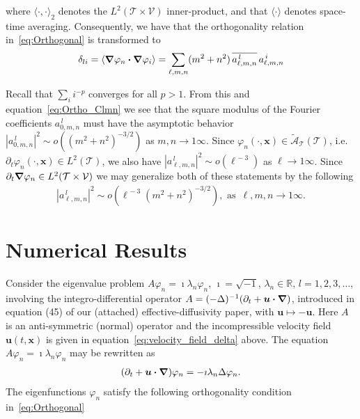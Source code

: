\documentclass[leqno,onefignum,onetabnum]{siamltex1213}
\newcommand{\Tc}{\mathcal{T}}
\newcommand{\Vc}{\mathcal{V}}
\newcommand{\As}{\mathscr{A}}
\newcommand\bnabla{\mbox{\boldmath${\nabla}$}}
\providecommand\bcdot{\boldsymbol{\cdot}}
\newcommand{\vecx}{\boldsymbol{x}}
\newcommand{\vecu}{\boldsymbol{u}}
\begin{document}
where $\langle\cdot,\cdot\rangle_2$ denotes the $L^2(\Tc\times\Vc)$ inner-product, and that
$\langle\cdot\rangle$ denotes space-time averaging. Consequently, we have that the
orthogonality relation in~\eqref{eq:Orthogonal} is transformed to   
%
\begin{align}\label{eq:Ortho_Clmn}
  \delta_{li}=\langle\bnabla \varphi_n\bcdot\bnabla \varphi_i\rangle
      = \sum_{\ell,m,n}(m^2+n^2)\,\overline{a^{\,l}_{\ell,m,n}}\,a^{\,i}_{\ell,m,n}
\end{align}
%


Recall that $\sum_ii^{-p}$ converges for all $p>1$. From this and
equation~\eqref{eq:Ortho_Clmn} we see that the square modulus of the  
Fourier coefficients $a^{\,l}_{0,m,n}$ must have the asymptotic behavior 
$|a^{\,l}_{0,m,n}|^2\sim o((m^2+n^2)^{-3/2})$ as $m,n\to1\infty$. Since
$\varphi_n(\cdot,\vecx)\in\tilde{\As}_{\Tc}(\Tc)$, i.e. $\partial_t\varphi_n(\cdot,\vecx)\in L^2(\Tc)$, we also
have $|a^{\,l}_{\ell,m,n}|^2\sim o(\ell^{\,-3})$ as $\ell\to1\infty$. Since
$\partial_t\bnabla \varphi_n\in L^2(\Tc\times\Vc)$ we may generalize 
both of these statements by the following
%
\begin{align}\label{eq:Clmn_assymptotics}
  |a^{\,l}_{\ell,m,n}|^2\sim o(\ell^{\,-3}(m^2+n^2)^{-3/2}), \text{ as } \,\ell,m,n\to1\infty.
\end{align}
%







\section{Numerical Results}
%
Consider the eigenvalue problem $A\varphi_n=\imath\lambda_n\varphi_n$, $\imath=\sqrt{-1}$,
$\lambda_n\in\mathbb{R}$, $l=1,2,3,\ldots$, involving the integro-differential operator
$A=(-\Delta)^{-1}(\partial_t+\vecu \bcdot\bnabla )$,  
introduced in equation (45) of our (attached) effective-diffusivity
paper, with $\vecu \mapsto-\vecu $. Here $A$ is an anti-symmetric (normal)
operator and the incompressible velocity field
$\vecu (t,\vecx)$
is given in equation~\eqref{eq:velocity_field_delta} above. The equation $A\varphi_n=\imath\lambda_n\varphi_n$ may be
rewritten as     
%
\begin{align}\label{eq:Eig_prob}
  (\partial_t+\vecu \bcdot\bnabla )\varphi_n=-\imath\lambda_n\Delta\varphi_n.
\end{align}
%
The eigenfunctions $\varphi_n$ satisfy the following orthogonality condition
in~\eqref{eq:Orthogonal}
%
\end{document}
